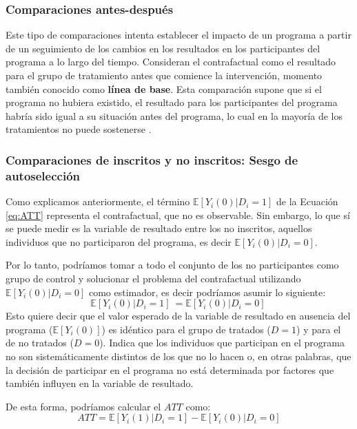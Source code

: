 \documentclass[../../main.tex]{subfiles}
\begin{document}
\subsubsection{Comparaciones antes-después}
Este tipo de comparaciones intenta establecer el impacto de un programa a partir de un
seguimiento de los cambios en los resultados en los participantes del programa a lo largo
del tiempo. Consideran el contrafactual como el resultado para el grupo de tratamiento
antes que comience la intervención, momento también conocido como \textbf{línea de base}.
Esta comparación supone que si el programa no hubiera existido, el resultado para los
participantes del programa habría sido igual a su situación antes del programa, lo cual en
la mayoría de los tratamientos no puede sostenerse \cite{gertler-2016}.

\subsubsection{Comparaciones de inscritos y no inscritos: Sesgo de autoselección}
Como explicamos anteriormente, el término \(\mathbb{E} \left[Y_i(0)|D_i=1\right]\) de la
Ecuación \ref{eq:ATT} representa el contrafactual, que no es observable. Sin embargo, lo
que sí se puede medir es la variable de resultado entre los no inscritos, aquellos
individuos que no participaron del programa, es decir \(\mathbb{E}
\left[Y_i(0)|D_i=0\right]\).

Por lo tanto, podríamos tomar a todo el conjunto de los no participantes como grupo de
control y solucionar el problema del contrafactual utilizando \(\mathbb{E}
\left[Y_i(0)|D_i=0\right]\) como estimador, es decir podríamos asumir lo siguiente:
\begin{equation}
    \mathbb{E} \left[Y_i(0)|D_i=1\right]\ = \mathbb{E} \left[Y_i(0)|D_i=0\right]\
    \label{eq:supuesto-1}  %
\end{equation}
Esto quiere decir que el valor esperado de la variable de resultado en ausencia del
programa (\(\mathbb{E}\left[Y_i(0)\right]\)) es idéntico para el grupo de tratados (\(D =
1\)) y para el de no tratados (\(D = 0\)). Indica que los individuos que participan en el
programa no son sistemáticamente distintos de los que no lo hacen \cite{bernal} o, en
otras palabras, que la decisión de participar en el programa no está determinada por
factores que también influyen en la variable de resultado.

De esta forma, podríamos calcular el \(ATT\) como:
\begin{equation}
    ATT = \mathbb{E} \left[Y_i(1)|D_i=1\right] - \mathbb{E} \left[Y_i(0)|D_i=0\right]
    \label{eq:ATT-con-supuesto-IC}
\end{equation}
\end{document}

